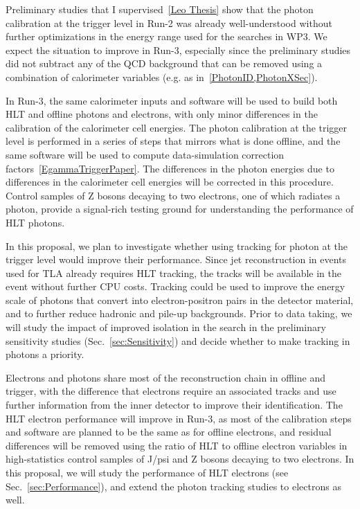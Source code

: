 Preliminary studies that I supervised~\ref{Leo Thesis} show that the photon calibration at the trigger level in Run-2 was already well-understood without further optimizations in the energy range used for the searches in WP3. We expect the situation to improve in Run-3, especially since the preliminary studies did not subtract any of the QCD background that can be removed using a combination of calorimeter variables (e.g. as in~\ref{PhotonID,PhotonXSec}). 

In Run-3, the same calorimeter inputs and software will be used to build both HLT and offline photons and electrons, with only minor differences in the calibration of the calorimeter cell energies. The photon calibration at the trigger level is performed in a series of steps that mirrors what is done offline, and the same software will be used to compute data-simulation correction factors~\ref{EgammaTriggerPaper}. The differences in the photon energies due to differences in the calorimeter cell energies will be corrected in this procedure. Control samples of Z bosons decaying to two electrons, one of which radiates a photon, provide a signal-rich testing ground for understanding the performance of HLT photons.  

In this proposal, we plan to investigate whether using tracking for photon at the trigger level would improve their performance. Since jet reconstruction in events used for TLA already requires HLT tracking, the tracks will be available in the event without further CPU costs. Tracking could be used to improve the energy scale of photons that convert into electron-positron pairs in the detector material, and to further reduce hadronic and pile-up backgrounds. Prior to data taking, we will study the impact of improved isolation in the search in the preliminary sensitivity studies (Sec.~\ref{sec:Sensitivity}) and decide whether to make tracking in photons a priority. 

Electrons and photons share most of the reconstruction chain in offline and trigger, with the difference that electrons require an associated tracks and use further information from the inner detector to improve their identification. The HLT electron performance will improve in Run-3, as most of the calibration steps and software are planned to be the same as for offline electrons, and residual differences will be removed using the ratio of HLT to offline electron variables in high-statistics control samples of J/psi and Z bosons decaying to two electrons. 
In this proposal, we will study the performance of HLT electrons (see Sec.~\ref{sec:Performance}), and extend the photon tracking studies to electrons as well.

